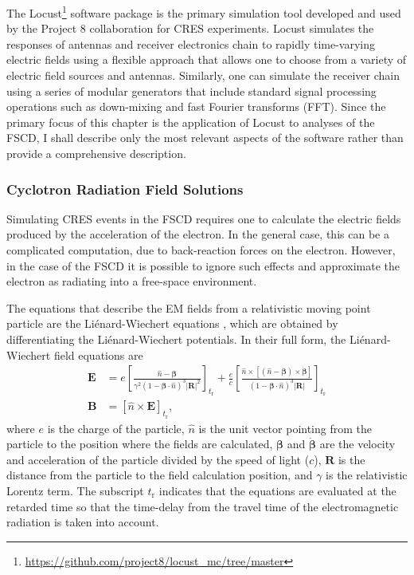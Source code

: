 The Locust\footnote{\url{https://github.com/project8/locust_mc/tree/master}} software package \cite{p8locustpaper} is the primary simulation tool developed and used by the Project 8 collaboration for CRES experiments. Locust simulates the responses of antennas and receiver electronics chain to rapidly time-varying electric fields using a flexible approach that allows one to choose from a variety of electric field sources and antennas. Similarly, one can simulate the receiver chain using a series of modular generators that include standard signal processing operations such as down-mixing and fast Fourier transforms (FFT). Since the primary focus of this chapter is the application of Locust to analyses of the FSCD, I shall describe only the most relevant aspects of the software rather than provide a comprehensive description.

\subsubsection*{Cyclotron Radiation Field Solutions}

Simulating CRES events in the FSCD requires one to calculate the electric fields produced by the acceleration of the electron. In the general case, this can be a complicated computation, due to back-reaction forces on the electron. However, in the case of the FSCD it is possible to ignore such effects and approximate the electron as radiating into a free-space environment. 

The equations that describe the EM fields from a relativistic moving point particle are the Li\'{e}nard-Wiechert equations \cite{lw_potential_1,lw_potential_2}, which are obtained by differentiating the Li\'{e}nard-Wiechert potentials. In their full form, the Li\'{e}nard-Wiechert field equations are
\begin{align}
    \bm{E} &=e\left[\frac{\hat{n}-\bm{\beta}}{\gamma^2(1-\bm{\beta}\cdot\hat{n})^3|\bm{R}|^2}\right]_{t_\textrm{r}}
      +\frac{e}{c}\left[\frac{\hat{n}\times[(\hat{n}-\bm{\beta})\times\dot{\bm{\beta}}]}{(1-\bm{\beta}\cdot\hat{n})^3|\bm{R}|}\right]_{t_\textrm{r}}\label{eq:chap4-lw-eqn-efield}\\
    \bm{B} &= \left[\hat{n}\times \bm{E}\right]_{t_\textrm{r}},
\end{align}
where $e$ is the charge of the particle, $\hat{n}$ is the unit vector pointing from the particle to the position where the fields are calculated, $\bm{\beta}$ and $\dot{\bm{\beta}}$ are the velocity and acceleration of the particle divided by the speed of light ($c$), $\bm{R}$ is the distance from the particle to the field calculation position, and $\gamma$ is the relativistic Lorentz term. The subscript $t_\mathrm{r}$ indicates that the equations are evaluated at the retarded time so that the time-delay from the travel time of the electromagnetic radiation is taken into account. 

